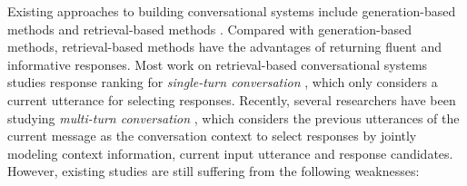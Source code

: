Existing approaches to building conversational systems include generation-based methods \cite{DBLP:conf/emnlp/RitterCD11,DBLP:conf/acl/ShangLL15} and retrieval-based methods \cite{DBLP:journals/corr/JiLL14,DBLP:conf/sigir/YanSW16,DBLP:conf/cikm/YanSZW16,DBLP:conf/sigir/YanZE17}. Compared with generation-based methods, retrieval-based methods have the advantages of returning fluent and informative responses. Most work on retrieval-based conversational systems studies response ranking for \textit{single-turn conversation} \cite{DBLP:conf/emnlp/WangLLC13}, which only considers a current utterance for selecting responses. Recently, several researchers have been studying \textit{multi-turn conversation} \cite{DBLP:conf/sigir/YanSW16,DBLP:conf/emnlp/ZhouDWZYTLY16,DBLP:conf/acl/WuWXZL17,DBLP:conf/sigir/YanZE17}, which considers the previous utterances of the current message as the conversation context to select responses by jointly modeling context information, current input utterance and response candidates. However, existing studies are still suffering from the following weaknesses: 



